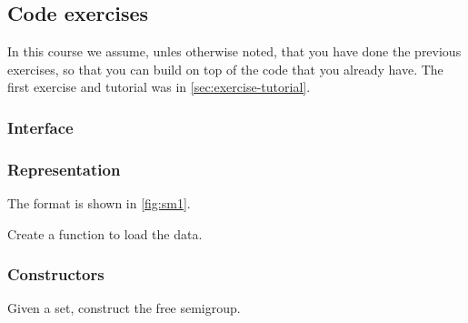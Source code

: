 \subsection{Code exercises}

\begin{remark}
  In this course we assume, unles otherwise noted, that you have done the previous exercises, so that you can build on top of the code that you already have. The first exercise and tutorial was in \cref{sec:exercise-tutorial}.
\end{remark}

\subsubsection*{Interface}


\subsubsection*{Representation}

The format is shown in \cref{fig:sm1}.



\begin{gradedexercise}
  \label{ex:TestFiniteSemigroupRepresentation}
  Create a function to load the data.



\end{gradedexercise}

\subsubsection*{Constructors}

\begin{gradedexercise}
  \label{ex:FiniteSemigroupRepresentation}
  Given a set, construct the free semigroup.

\end{gradedexercise}
